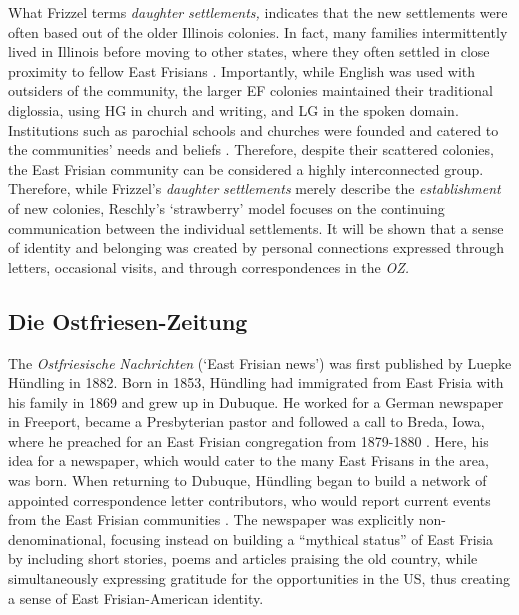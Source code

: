\documentclass[output=paper]{langsci/langscibook}
\begin{document}
What Frizzel terms \textit{daughter} \textit{settlements,} indicates that the new settlements were often based out of the older Illinois colonies. In fact, many families intermittently lived in Illinois before moving to other states, where they often settled in close proximity to fellow East Frisians \citep{Schnucker1917}. Importantly, while English was used with outsiders of the community, the larger EF colonies maintained their traditional diglossia, using HG in church and writing, and LG in the spoken domain. Institutions such as parochial schools and churches were founded and catered to the communities’ needs and beliefs \citep{Wirrer1995}. Therefore, despite their scattered colonies, the East Frisian community can be considered a highly interconnected group. Therefore, while Frizzel’s \textit{daughter} \textit{settlements} merely describe the \textit{establishment} of new colonies, Reschly’s ‘strawberry’ model focuses on the continuing communication between the individual settlements. It will be shown that a sense of identity and belonging was created by personal connections expressed through letters, occasional visits, and through correspondences in the \textit{OZ.} 

\subsection{Die Ostfriesen-Zeitung} %
\label{sec:rocker:3.2}

The \textit{Ostfriesische} \textit{Nachrichten} (‘East Frisian news’) was first published by Luepke Hündling in 1882. Born in 1853, Hündling had immigrated from East Frisia with his family in 1869 and grew up in Dubuque. He worked for a German newspaper in Freeport, became a Presbyterian pastor and followed a call to Breda, Iowa, where he preached for an East Frisian congregation from 1879-1880 \citep{Lindaman2004}. Here, his idea for a newspaper, which would cater to the many East Frisans in the area, was born. When returning to Dubuque, Hündling began to build a network of appointed correspondence letter contributors, who would report current events from the East Frisian communities \citep[81]{Lindaman2004}. The newspaper was explicitly non-denominational, focusing instead on building a “mythical status” \citep[82]{Lindaman2004} of East Frisia by including short stories, poems and articles praising the old country, while simultaneously expressing gratitude for the opportunities in the US, thus creating a sense of East Frisian-American identity. 
\end{document}
